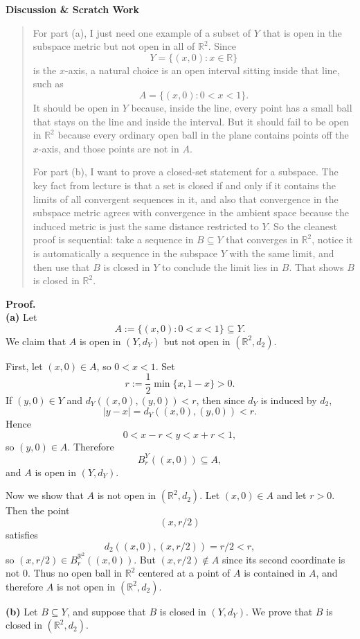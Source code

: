 \documentclass[12pt]{article}
\newenvironment{scratch}{%
  \par\smallskip
  \noindent\textbf{Discussion \& Scratch Work}\begin{quote}\small
}{%
  \end{quote}\smallskip
}
\begin{document}
\begin{scratch}
For part (a), I just need one example of a subset of $Y$ that is open in the subspace metric but not open in all of $\mathbb{R}^2$. Since
\[
Y=\{(x,0):x\in\mathbb{R}\}
\]
is the $x$-axis, a natural choice is an open interval sitting inside that line, such as
\[
A=\{(x,0):0<x<1\}.
\]
It should be open in $Y$ because, inside the line, every point has a small ball that stays on the line and inside the interval. But it should fail to be open in $\mathbb{R}^2$ because every ordinary open ball in the plane contains points off the $x$-axis, and those points are not in $A$.

For part (b), I want to prove a closed-set statement for a subspace. The key fact from lecture is that a set is closed if and only if it contains the limits of all convergent sequences in it, and also that convergence in the subspace metric agrees with convergence in the ambient space because the induced metric is just the same distance restricted to $Y$. So the cleanest proof is sequential: take a sequence in $B\subseteq Y$ that converges in $\mathbb{R}^2$, notice it is automatically a sequence in the subspace $Y$ with the same limit, and then use that $B$ is closed in $Y$ to conclude the limit lies in $B$. That shows $B$ is closed in $\mathbb{R}^2$.
\end{scratch}

\textbf{Proof.}\\
\textbf{(a)} Let
\[
A:=\{(x,0):0<x<1\}\subseteq Y.
\]
We claim that $A$ is open in $(Y,d_Y)$ but not open in $(\mathbb{R}^2,d_2)$.

First, let $(x,0)\in A$, so $0<x<1$. Set
\[
r:=\frac12\min\{x,1-x\}>0.
\]
If $(y,0)\in Y$ and $d_Y((x,0),(y,0))<r$, then since $d_Y$ is induced by $d_2$,
\[
|y-x|=d_Y((x,0),(y,0))<r.
\]
Hence
\[
0<x-r<y<x+r<1,
\]
so $(y,0)\in A$. Therefore
\[
B_r^{Y}((x,0))\subseteq A,
\]
and $A$ is open in $(Y,d_Y)$.

Now we show that $A$ is not open in $(\mathbb{R}^2,d_2)$. Let $(x,0)\in A$ and let $r>0$. Then the point
\[
(x,r/2)
\]
satisfies
\[
d_2((x,0),(x,r/2))=r/2<r,
\]
so $(x,r/2)\in B_r^{\mathbb{R}^2}((x,0))$. But $(x,r/2)\notin A$ since its second coordinate is not $0$. Thus no open ball in $\mathbb{R}^2$ centered at a point of $A$ is contained in $A$, and therefore $A$ is not open in $(\mathbb{R}^2,d_2)$.

\textbf{(b)} Let $B\subseteq Y$, and suppose that $B$ is closed in $(Y,d_Y)$. We prove that $B$ is closed in $(\mathbb{R}^2,d_2)$.
\end{document}
